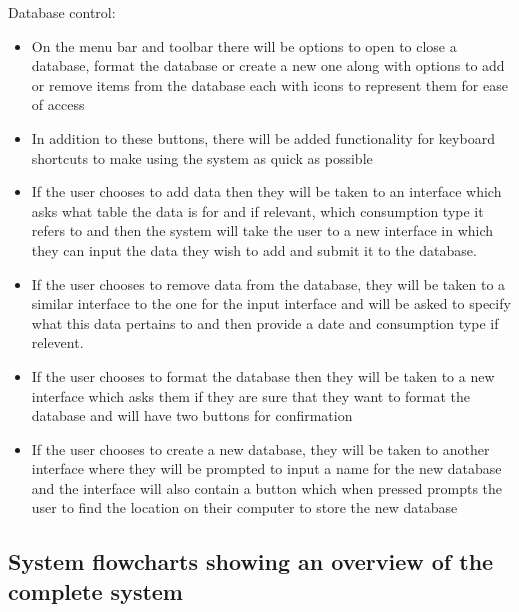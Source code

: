 Database control:
\begin{itemize}
\item{On the menu bar and toolbar there will be options to open to close a database, format the database  or create a new one along with options to add or remove items from the database each with icons to represent them for ease of access}
\item{In addition to these buttons, there will be added functionality for keyboard shortcuts to make using the system as quick as possible}
\item{If the user chooses to add data then they will be taken to an interface which asks what table the data is for and if relevant, which consumption type it refers to and then the system will take the user to a new interface in which they can input the data they wish to add and submit it to the database.}
\item{If the user chooses to remove data from the database, they will be taken to a similar interface to the one for the input interface and will be asked to specify what this data pertains to and then provide a date and consumption type if relevent.}
\item{If the user chooses to format the database then they will be taken to a new interface which asks them if they are sure that they want to format the database and will have two buttons for confirmation}
\item{If the user chooses to create a new database, they will be taken to another interface where they will be prompted to input a name for the new database and the interface will also contain a button which when pressed prompts the user to find the location on their computer to store the new database}
\end{itemize}

\subsection{System flowcharts showing an overview of the complete system}

